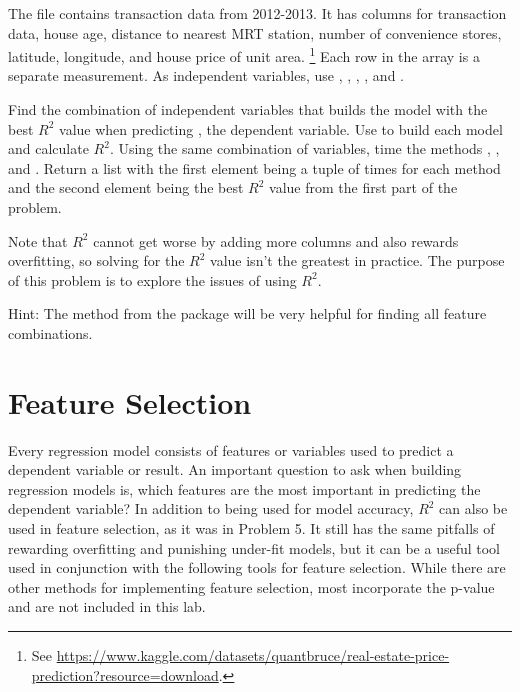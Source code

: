 \begin{problem}
The file  contains transaction data from 2012-2013.
It has columns for transaction data, house age, distance to nearest MRT station, number of convenience stores, latitude, longitude, and house price of unit area. \footnote{See \url{https://www.kaggle.com/datasets/quantbruce/real-estate-price-prediction?resource=download}.}
Each row in the array is a separate measurement.
As independent variables, use , , , , and .

Find the combination of independent variables that builds the model with the best $R^2$ value when predicting , the dependent variable. Use  to build each model and calculate $R^2$.
Using the same combination of variables, time the methods , , and .
Return a list with the first element being a tuple of times for each method and the second element being the best $R^2$ value from the first part of the problem.

Note that $R^2$ cannot get worse by adding more columns and also rewards overfitting, so solving for the $R^2$ value isn't the greatest in practice. The purpose of this problem is to explore the issues of using $R^2$.

Hint: The  method from the  package will be very helpful for finding all feature combinations.
\end{problem}

\section*{Feature Selection}

Every regression model consists of features or variables used to predict a dependent variable or result.
An important question to ask when building regression models is, which features are the most important in predicting the dependent variable?
In addition to being used for model accuracy, $R^2$ can also be used in feature selection, as it was in Problem 5.
It still has the same pitfalls of rewarding overfitting and punishing under-fit models, but it can be a useful tool used in conjunction with the following tools for feature selection.
While there are other methods for implementing feature selection, most incorporate the p-value and are not included in this lab.

